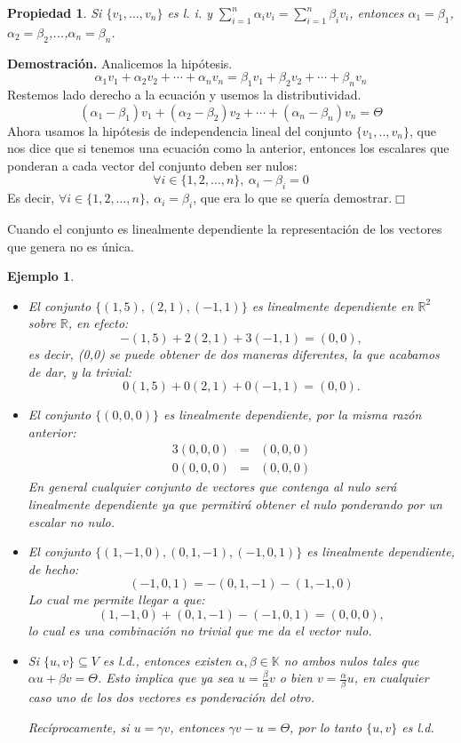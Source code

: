 \documentclass[12pt]{book}
\newtheorem{prop}{Propiedad}
\newtheorem{ejem}{Ejemplo}
\def\R{\mathbb{R}}
\def\K{\mathbb{K}}
\begin{document}
\begin{prop}
Si $\{v_1,\dots,v_n\}$ es l. i. y  $\displaystyle{ \sum_{i=1}^n \alpha_iv_i=\sum_{i=1}^n \beta_iv_i}$, entonces $\alpha_1=\beta_1$, $\alpha_2=\beta_2$,...,$\alpha_n=\beta_n$.
\end{prop}
{\bf Demostración.} {
Analicemos la hipótesis.
$$\alpha_1v_1+\alpha_2v_2+\cdots+\alpha_n v_n=\beta_1v_1+\beta_2v_2+\cdots+\beta_n v_n$$
Restemos lado derecho a la ecuación y usemos la distributividad.
$$(\alpha_1-\beta_1)v_1+(\alpha_2-\beta_2)v_2+\cdots+(\alpha_n-\beta_n) v_n=\Theta$$
Ahora usamos la hipótesis de independencia lineal del conjunto $\{v_1,..,v_n\}$, que nos dice que si tenemos una ecuación como la anterior, entonces los escalares que ponderan a cada vector del conjunto deben ser nulos:
$$\forall i\in\{1,2,\dots,n\},\ \alpha_i-\beta_i=0$$
Es decir, $\forall i\in\{1,2,\dots,n\},\ \alpha_i=\beta_i$, que era lo que se quería demostrar.\hfill $\Box$
}

Cuando el conjunto es linealmente dependiente la representación de los vectores que genera no es única.

\begin{ejem}
{\em 
\begin{itemize}
\item El conjunto $\{(1,5),(2,1),(-1,1)\}$ es linealmente dependiente en $\R^2$ sobre $\R$, en efecto:
$$-(1,5)+2(2,1)+3(-1,1)=(0,0),$$
es decir, (0,0) se puede obtener de dos maneras diferentes, la que acabamos de dar, y la trivial: 
$$0(1,5)+0(2,1)+0(-1,1)=(0,0).$$
\item El conjunto $\{(0,0,0)\}$ es linealmente dependiente, por la misma razón anterior:
\begin{eqnarray*}
3(0,0,0)&=&(0,0,0)\\
0(0,0,0)&=&(0,0,0)
\end{eqnarray*}
En general cualquier conjunto de vectores que contenga al nulo será linealmente dependiente ya que permitirá obtener el nulo ponderando por un escalar no nulo.
\item El conjunto $\{(1,-1,0),(0,1,-1),(-1,0,1)\}$ es linealmente dependiente, de hecho:
$$(-1,0,1)=-(0,1,-1)-(1,-1,0)$$
Lo cual me permite llegar a que:
$$(1,-1,0)+(0,1,-1)-(-1,0,1)=(0,0,0),$$
lo cual es una combinación no trivial que me da el vector nulo.
\item Si $\{u,v\}\subseteq V$ es l.d., entonces existen $\alpha,\beta\in\K$ no ambos nulos tales que $\alpha u+\beta v=\Theta$.
Esto implica que ya sea $u=\frac{\beta}{\alpha}v$ o bien $v=\frac{\alpha}{\beta} u$, en cualquier caso uno de los dos vectores es ponderación del otro.

Recíprocamente, si $u=\gamma v$, entonces $\gamma v-u=\Theta$, por lo tanto $\{u,v\}$ es l.d.
\end{itemize}
}
\end{ejem}
\end{document}
